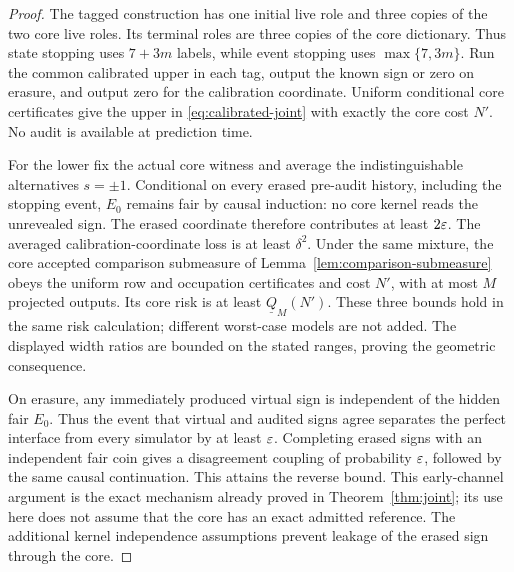 \begin{proof}
The tagged construction has one initial live role and three copies of the two core live roles. Its terminal roles are three copies of the core dictionary. Thus state stopping uses $7+3m$ labels, while event stopping uses $\max\{7,3m\}$. Run the common calibrated upper in each tag, output the known sign or zero on erasure, and output zero for the calibration coordinate. Uniform conditional core certificates give the upper in \eqref{eq:calibrated-joint} with exactly the core cost $N'$. No audit is available at prediction time.

For the lower fix the actual core witness and average the indistinguishable alternatives $s=\pm1$. Conditional on every erased pre-audit history, including the stopping event, $E_0$ remains fair by causal induction: no core kernel reads the unrevealed sign. The erased coordinate therefore contributes at least $2\varepsilon$. The averaged calibration-coordinate loss is at least $\delta^2$. Under the same mixture, the core accepted comparison submeasure of Lemma~\ref{lem:comparison-submeasure} obeys the uniform row and occupation certificates and cost $N'$, with at most $M$ projected outputs. Its core risk is at least $\underline Q_M(N')$. These three bounds hold in the same risk calculation; different worst-case models are not added. The displayed width ratios are bounded on the stated ranges, proving the geometric consequence.

On erasure, any immediately produced virtual sign is independent of the hidden fair $E_0$. Thus the event that virtual and audited signs agree separates the perfect interface from every simulator by at least $\varepsilon$. Completing erased signs with an independent fair coin gives a disagreement coupling of probability $\varepsilon$, followed by the same causal continuation. This attains the reverse bound. This early-channel argument is the exact mechanism already proved in Theorem~\ref{thm:joint}; its use here does not assume that the core has an exact admitted reference. The additional kernel independence assumptions prevent leakage of the erased sign through the core.
\end{proof}

